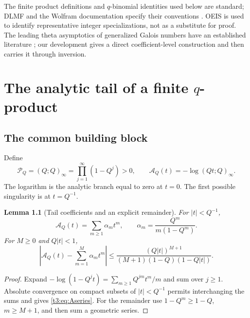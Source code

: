 \documentclass[11pt,openany]{book}
\numberwithin{equation}{chapter}
\theoremstyle{plain}
\newtheorem{lemma}[theorem]{Lemma}
\theoremstyle{definition}
\theoremstyle{remark}
\newcommand{\Pinf}{\mathcal P_Q}
\newcommand{\A}{\mathcal A_Q}
\begin{document}
The finite product definitions and $q$-binomial identities used below are standard; DLMF and the Wolfram documentation specify their conventions \cite{dlmfq,wlqbinomial,wlqpochhammer}. OEIS is used to identify representative integer specializations, not as a substitute for proof. The leading theta asymptotics of generalized Galois numbers have an established literature \cite{kousidis,bliem}; our development gives a direct coefficient-level construction and then carries it through inversion.

\chapter{The analytic tail of a finite $q$-product}
\label{ct:ch:qtail}

\label{t3:sec:qtail}

\section{The common building block}

Define
\begin{equation}\label{t3:eq:pinf}
 \Pinf=(Q;Q)_\infty=\prod_{j=1}^{\infty}(1-Q^j)>0,
 \qquad
 \A(t)=-\log(Qt;Q)_\infty.
\end{equation}
The logarithm is the analytic branch equal to zero at $t=0$. The first possible singularity is at $t=Q^{-1}$.

\begin{lemma}[Tail coefficients and an explicit remainder]\label{t3:lem:Atail}
For $|t|<Q^{-1}$,
\begin{equation}\label{t3:eq:Aseries}
 \A(t)=\sum_{m\ge1}\alpha_m t^m,
 \qquad \alpha_m=\frac{Q^m}{m(1-Q^m)}.
\end{equation}
For $M\ge0$ and $Q|t|<1$,
\begin{equation}\label{t3:eq:Atailbound}
 \left|\A(t)-\sum_{m=1}^M\alpha_m t^m\right|
 \le \frac{(Q|t|)^{M+1}}
 {(M+1)(1-Q)(1-Q|t|)}.
\end{equation}
\end{lemma}
\begin{proof}
Expand $-\log(1-Q^jt)=\sum_{m\ge1}Q^{jm}t^m/m$ and sum over $j\ge1$. Absolute convergence on compact subsets of $|t|<Q^{-1}$ permits interchanging the sums and gives \eqref{t3:eq:Aseries}. For the remainder use $1-Q^m\ge1-Q$, $m\ge M+1$, and then sum a geometric series.
\end{proof}
\end{document}
